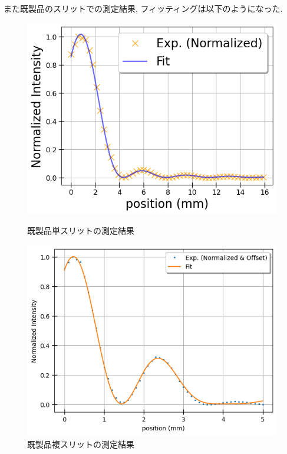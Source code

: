 \documentclass[11pt]{ltjsarticle}
\begin{document}
    また既製品のスリットでの測定結果, フィッティングは以下のようになった.
    \begin{figure}[H]
      \centering
      \begin{minipage}[b]{0.48\columnwidth}
        \centering
        \includegraphics[width=\linewidth]{single_kisei.png}
        \caption{既製品単スリットの測定結果}
        \label{fig:single_result_seizou}
      \end{minipage}
      \begin{minipage}[b]{0.48\columnwidth}
        \centering
        \includegraphics[width=\linewidth]{double_kisei.png}
        \caption{既製品複スリットの測定結果}
        \label{fig:double_result_seizou}
      \end{minipage}
    \end{figure}
\end{document}
